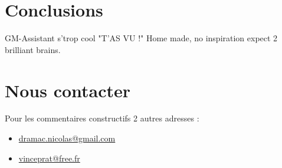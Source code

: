 \documentclass[a4paper,12pt]{article}
\newcommand*{\GMA}{GM-Assistant\xspace}
\begin{document}
\section{Conclusions}\label{conclusions}
\GMA s'trop cool "T'AS VU !"
Home made, no inspiration expect 2 brilliant brains.

\section*{Nous contacter}
Pour les commentaires constructifs 2 autres adresses :
\begin{itemize}
    \item \href{mailto:dramac.nicolas@gmail.com}{dramac.nicolas@gmail.com}
    \item \href{mailto:vinceprat@free.fr}{vinceprat@free.fr}
\end{itemize}
\end{document}
